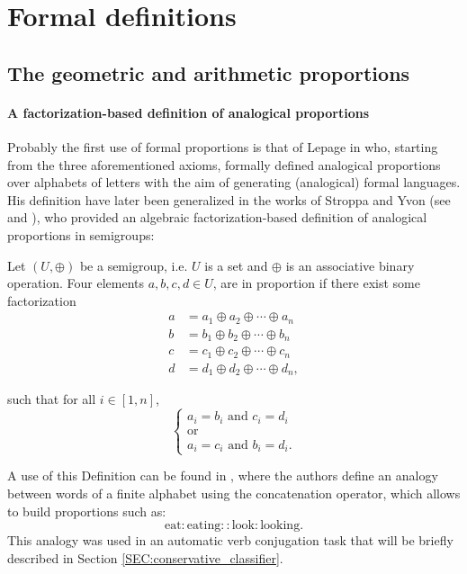 \section{Formal definitions}
\label{SEC:formal_definitions_proportions}

\subsection{The geometric and arithmetic proportions}

\paragraph{A factorization-based definition of analogical proportions\\}

Probably the first use of formal proportions is that of Lepage in \cite{Lep04}
who, starting from the three aforementioned axioms, formally defined analogical
proportions over alphabets of letters with the aim of generating (analogical)
formal languages. His definition have later been generalized in the works of
Stroppa and Yvon (see \cite{StrYvoCNLL05} and \cite{StrYvoREPORT05}), who
provided an algebraic factorization-based definition of analogical proportions
in semigroups:

\begin{definition}
\label{DEF:proportion_semi_group}
Let $(U, \oplus)$ be a semigroup, i.e. $U$ is a set and $\oplus$ is an
  associative binary operation. Four elements $a, b, c, d \in U$, are in proportion if
  there exist some factorization
  \begin{align*}
    a &= a_1 \oplus a_2 \oplus \cdots \oplus a_n\\
    b &= b_1 \oplus b_2 \oplus \cdots \oplus b_n\\
    c &= c_1 \oplus c_2 \oplus \cdots \oplus c_n\\
    d &= d_1 \oplus d_2 \oplus \cdots \oplus d_n,
  \end{align*}

  such that for all $i \in [1, n]$,
  $$
  \begin{cases}
    a_i = b_i \text{ and } c_i = d_i\\
    \text{or}\\
    a_i = c_i \text{ and } b_i = d_i.
  \end{cases}
  $$
\end{definition}

\begin{testexample}
  A use of this Definition can be found in \cite{StrYvoREPORT05}, where
  the authors define an analogy between words of a finite alphabet using the
  concatenation operator, which allows to build proportions such as:
  $$\text{eat} : \text{eating} :: \text{look} : \text{looking}.$$ This analogy
  was used in an automatic verb conjugation task that will be briefly described
  in Section \ref{SEC:conservative_classifier}.
\end{testexample}

